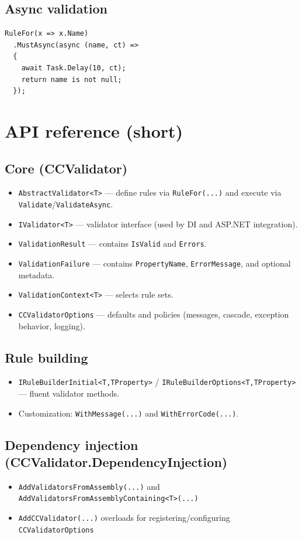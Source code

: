 \documentclass[12pt]{article}
\begin{document}
\subsection{Async validation}
\begin{lstlisting}
RuleFor(x => x.Name)
  .MustAsync(async (name, ct) =>
  {
    await Task.Delay(10, ct);
    return name is not null;
  });
\end{lstlisting}

\section{API reference (short)}

\subsection{Core (CCValidator)}
\begin{itemize}[noitemsep]
  \item \texttt{AbstractValidator<T>} --- define rules via \texttt{RuleFor(...)} and execute via \texttt{Validate}/\texttt{ValidateAsync}.
  \item \texttt{IValidator<T>} --- validator interface (used by DI and ASP.NET integration).
  \item \texttt{ValidationResult} --- contains \texttt{IsValid} and \texttt{Errors}.
  \item \texttt{ValidationFailure} --- contains \texttt{PropertyName}, \texttt{ErrorMessage}, and optional metadata.
  \item \texttt{ValidationContext<T>} --- selects rule sets.
  \item \texttt{CCValidatorOptions} --- defaults and policies (messages, cascade, exception behavior, logging).
\end{itemize}

\subsection{Rule building}
\begin{itemize}[noitemsep]
  \item \texttt{IRuleBuilderInitial<T,TProperty>} / \texttt{IRuleBuilderOptions<T,TProperty>} --- fluent validator methods.
  \item Customization: \texttt{WithMessage(...)} and \texttt{WithErrorCode(...)}.
\end{itemize}

\subsection{Dependency injection (CCValidator.DependencyInjection)}
\begin{itemize}[noitemsep]
  \item \texttt{AddValidatorsFromAssembly(...)} and \texttt{AddValidatorsFromAssemblyContaining<T>(...)}
  \item \texttt{AddCCValidator(...)} overloads for registering/configuring \texttt{CCValidatorOptions}
\end{itemize}
\end{document}
